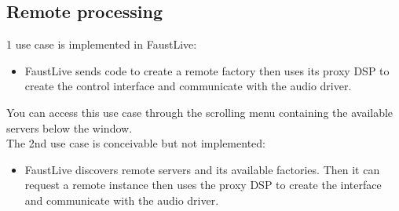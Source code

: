\documentclass[a4paper]{article}
\begin{document}
\newpage
\subsection {Remote processing} \label{remoteprocessing}

1 use case is implemented in FaustLive:
\begin{itemize}
\item FaustLive sends code to create a remote factory then uses its proxy DSP to create the control interface and communicate with the audio driver.
\end{itemize}
You can access this use case through the scrolling menu containing the available servers below the window. \\

The 2nd use case is conceivable but not implemented:
\begin{itemize}
\item FaustLive discovers remote servers and its available factories. Then it can request a remote instance then uses the proxy DSP to create the interface and communicate with the audio driver.
\end{itemize}
\end{document}
